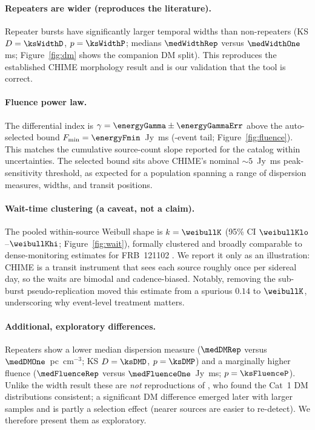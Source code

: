 \documentclass[twocolumn]{aastex631}
\begin{document}
\paragraph{Repeaters are wider (reproduces the literature).} Repeater bursts have
significantly larger temporal widths than non-repeaters (KS $D=\ksWidthD$,
$p=\ksWidthP$; medians $\medWidthRep$ versus $\medWidthOne$ ms; Figure~\ref{fig:dm}
shows the companion DM split). This reproduces the established CHIME morphology result
\citep{pleunis2021} and is our validation that the tool is correct.

\paragraph{Fluence power law.} The differential index is
$\gamma=\energyGamma\pm\energyGammaErr$ above the auto-selected bound
$F_\mathrm{min}=\energyFmin$~Jy~ms (\energyNtail-event tail; Figure~\ref{fig:fluence}).
This matches the cumulative source-count slope reported for the catalog within
uncertainties. The selected bound sits above CHIME's nominal $\sim5$~Jy~ms
peak-sensitivity threshold, as expected for a population spanning a range of dispersion
measures, widths, and transit positions.

\paragraph{Wait-time clustering (a caveat, not a claim).} The pooled within-source
Weibull shape is $k=\weibullK$ (95\% CI $\weibullKlo$--$\weibullKhi$; Figure~\ref{fig:wait}),
formally clustered and broadly comparable to dense-monitoring estimates for FRB~121102
\citep{oppermann2018}. We report it only as an illustration: CHIME is a transit instrument
that sees each source roughly once per sidereal day, so the waits are bimodal and
cadence-biased. Notably, removing the sub-burst pseudo-replication moved this estimate from
a spurious $0.14$ to $\weibullK$, underscoring why event-level treatment matters.

\paragraph{Additional, exploratory differences.} Repeaters show a lower median dispersion
measure ($\medDMRep$ versus $\medDMOne$~pc~cm$^{-3}$; KS $D=\ksDMD$, $p=\ksDMP$) and a
marginally higher fluence ($\medFluenceRep$ versus $\medFluenceOne$~Jy~ms; $p=\ksFluenceP$).
Unlike the width result these are \emph{not} reproductions of \citet{pleunis2021}, who found
the Cat~1 DM distributions consistent; a significant DM difference emerged later with larger
samples \citep{chime25repeaters} and is partly a selection effect (nearer sources are easier
to re-detect). We therefore present them as exploratory.
\end{document}
